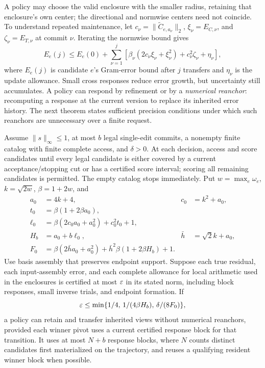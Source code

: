 A policy may choose the valid enclosure with the smaller radius, retaining that enclosure's own center; the directional and normwise centers need not coincide. To understand repeated maintenance, let $c_\nu=\|\widetilde C_{e,a_\nu}\|_2$, $\xi_\nu=E_{C,\nu}$, and $\zeta_\nu=E_{T,\nu}$ at commit $\nu$. Iterating the normwise bound gives
\begin{equation}
 E_e(j)\le E_e(0)+\sum_{\nu=1}^{j}
 [\beta_\nu(2c_\nu\xi_\nu+\xi_\nu^2)
       +c_\nu^2\zeta_\nu+\eta_\nu],
 \label{eq:accumulation}
\end{equation}
where $E_e(j)$ is candidate $e$'s Gram-error bound after $j$ transfers and $\eta_\nu$ is the update allowance. Small cross responses reduce error growth, but uncertainty still accumulates. A policy can respond by refinement or by a \emph{numerical reanchor}: recomputing a response at the current version to replace its inherited error history. The next theorem states sufficient precision conditions under which such reanchors are unnecessary over a finite request.

\begin{theorem}\label{thm:finite}
Assume $\|s\|_\infty\le1$, at most $b$ legal single-edit commits, a nonempty finite catalog with finite complete access, and $\delta>0$. At each decision, access and score candidates until every legal candidate is either covered by a current acceptance/stopping cut or has a certified score interval; scoring all remaining candidates is permitted. The empty catalog stops immediately. Put $w=\max_e\omega_e$, $k=\sqrt{2w}$, $\beta=1+2w$, and
\begin{equation}
 \begin{aligned}
 a_0&=4k+4,&c_0&=k^2+a_0,\\
 t_0&=\beta(1+2\beta a_0),\\
 \ell_0&=\beta(2c_0a_0+a_0^2)+c_0^2t_0+1,\\
 H_b&=a_0+b\ell_0,&\bar h&=\sqrt2k+a_0,\\
 F_0&=\beta(2\bar h a_0+a_0^2)
       +\bar h^2\beta(1+2\beta H_b)+1.
 \end{aligned}
 \label{eq:finite-constants}
\end{equation}
Use basis assembly that preserves endpoint support. Suppose each true residual, each input-assembly error, and each complete allowance for local arithmetic used in the enclosures is certified at most $\varepsilon$ in its stated norm, including block responses, small inverse trials, and endpoint formation. If
\begin{equation}
 \varepsilon\le\min\{1/4,\,1/(4\beta H_b),\,\delta/(8F_0)\},
 \label{eq:finite-eps}
\end{equation}
a policy can retain and transfer inherited views without numerical reanchors, provided each winner pivot uses a current certified response block for that transition. It uses at most $N+b$ response blocks, where $N$ counts distinct candidates first materialized on the trajectory, and reuses a qualifying resident winner block when possible.
\end{theorem}

